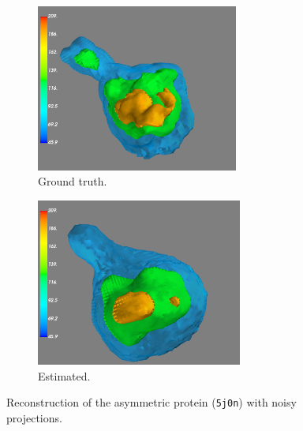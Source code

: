 \begin{figure}
    \centering
    \begin{subfigure}[b]{0.45\textwidth}
        \includegraphics[height=5.5cm]{images/5j0n_reconstruction_GT_noise16.png}
        \caption{Ground truth.}
    \end{subfigure}
    \hfill
    \begin{subfigure}[b]{0.5\textwidth}
    \centering
        \includegraphics[height=5.5cm]{images/5j0n_reconstruction_noise16.png}
        \caption{Estimated.}
    \end{subfigure}
    \caption{
        Reconstruction of the asymmetric protein (\texttt{5j0n}) with noisy projections.
    }\label{fig:reconstruction-noise0}
\end{figure}


